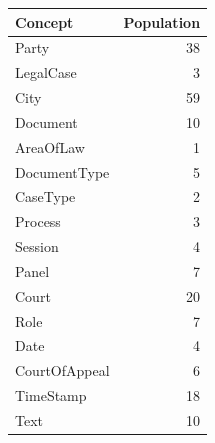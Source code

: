 \documentclass[10pt,a4paper]{report}              %
\theoremstyle{plain}\theorembodyfont{\rmfamily}\newtheorem{definition}{Definition}[section]
\theoremstyle{plain}\theorembodyfont{\rmfamily}\newtheorem{designrule}[definition]{Requirement}
\begin{document}
\begin{center}
\begin{tabular}{lr}
Concept & Population\\
\hline
Party & 38\\
LegalCase & 3\\
City & 59\\
Document & 10\\
AreaOfLaw & 1\\
DocumentType & 5\\
CaseType & 2\\
Process & 3\\
Session & 4\\
Panel & 7\\
Court & 20\\
Role & 7\\
Date & 4\\
CourtOfAppeal & 6\\
TimeStamp & 18\\
Text & 10\\
\end{tabular}
\end{center}
\end{document}
